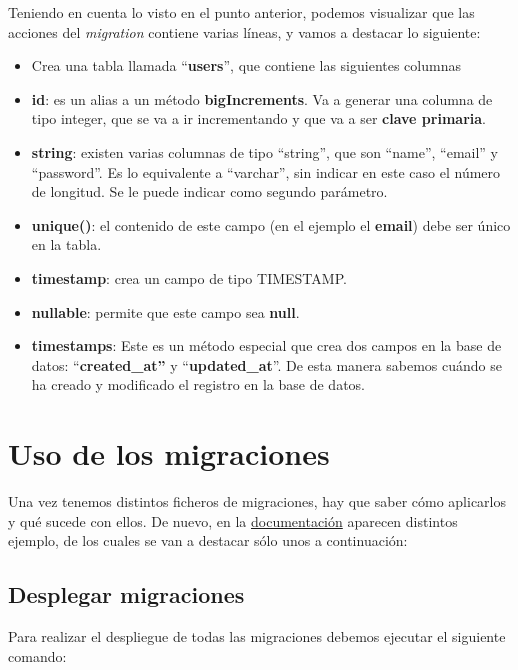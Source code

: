 Teniendo en cuenta lo visto en el punto anterior, podemos visualizar que las acciones del \textit{migration} contiene varias líneas, y vamos a destacar lo siguiente:

\begin{itemize}
    \item Crea una tabla llamada “\textbf{users}”, que contiene las siguientes columnas
    \item \textbf{id}: es un alias a un método \textbf{bigIncrements}. Va a generar una columna de tipo integer, que se va a ir incrementando y que va a ser \textbf{clave primaria}.

    \item \textbf{string}: existen varias columnas de tipo “string”, que son “name”, “email” y “password”. Es lo equivalente a “varchar”, sin indicar en este caso el número de longitud. Se le puede indicar como segundo parámetro.
    \item \textbf{unique()}: el contenido de este campo (en el ejemplo el \textbf{email}) debe ser único en la tabla.
    \item \textbf{timestamp}: crea un campo de tipo TIMESTAMP.
    \item \textbf{nullable}: permite que este campo sea \textbf{null}.

    \item \textbf{timestamps}: Este es un método especial que crea dos campos en la base de datos: “\textbf{created\_at”} y “\textbf{updated\_at}”. De esta manera sabemos cuándo se ha creado y modificado el registro en la base de datos.
\end{itemize}


\section{Uso de los migraciones}

Una vez tenemos distintos ficheros de migraciones, hay que saber cómo aplicarlos y qué sucede con ellos. De nuevo, en la \href{https://laravel.com/docs/10.x/migrations#running-migrations}{documentación} aparecen distintos ejemplo, de los cuales se van a destacar sólo unos a continuación:

\subsection{Desplegar migraciones}
Para realizar el despliegue de todas las migraciones debemos ejecutar el siguiente comando:

